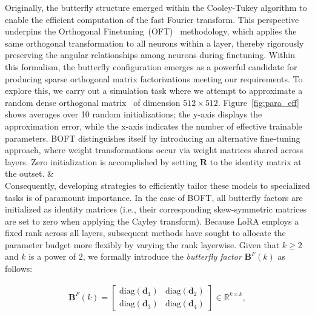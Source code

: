 Originally, the butterfly structure emerged within the Cooley-Tukey algorithm to enable the efficient computation of the fast Fourier transform. This perspective underpins the Orthogonal Finetuning~(OFT)~\cite{qiu2023controlling} methodology, which applies the same orthogonal transformation to all neurons within a layer, thereby rigorously preserving the angular relationships among neurons during finetuning. Within this formalism, the butterfly configuration emerges as a powerful candidate for producing sparse orthogonal matrix factorizations meeting our requirements. To explore this, we carry out a simulation task where we attempt to approximate a random dense orthogonal matrix~\cite{anderson1987generation} of dimension $512\times 512$. Figure~\ref{fig:para_eff} shows averages over 10 random initializations; the y-axis displays the approximation error, while the x-axis indicates the number of effective trainable parameters. BOFT distinguishes itself by introducing an alternative fine-tuning approach, where weight transformations occur via weight matrices shared across layers. Zero initialization is accomplished by setting $\bm{R}$ to the identity matrix at the outset. &  \\
    \!\!\!\!\! Consequently, developing strategies to efficiently tailor these models to specialized tasks is of paramount importance. In the case of BOFT, all butterfly factors are initialized as identity matrices (i.e., their corresponding skew-symmetric matrices are set to zero when applying the Cayley transform). Because LoRA employs a fixed rank across all layers, subsequent methods \cite{zhang2022adaptive,valipour2022dylora,zhang2023increlora} have sought to allocate the parameter budget more flexibly by varying the rank layerwise. Given that $k \geq 2$ and $k$ is a power of $2$, we formally introduce the \emph{butterfly factor} $\bm{B}^F(k)$ as follows:

\begin{equation}\label{eq:but_factor}
\begin{aligned}
    \bm{B}^F(k)=\begin{bmatrix}
    \text{diag}(\bm{d}_1) & \text{diag}(\bm{d}_2) \\
    \text{diag}(\bm{d}_3) & \text{diag}(\bm{d}_4)
    \end{bmatrix}\in\mathbb{R}^{k\times k},
\end{aligned}
\end{equation}

